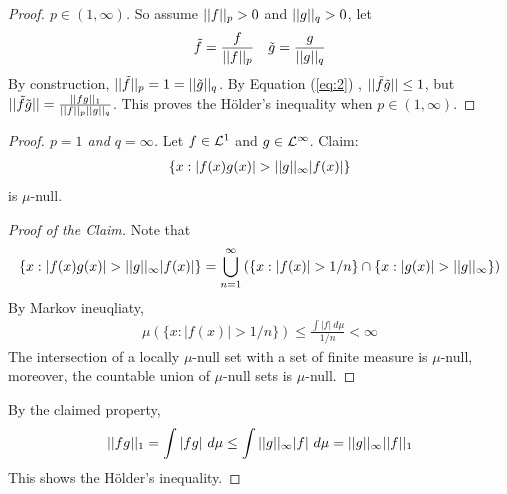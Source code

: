 \documentclass[11pt]{article}
\newcommand{\dmu}[0]{\ d\mu}
\begin{document}
\begin{theorem}
\begin{proof}[Proof. $p \in (1, \infty)$]
			So assume $\vert \vert {f} \vert \vert_p > 0$ and $\vert \vert {g} \vert \vert_q > 0$, let
			\begin{align}
				\tilde{f} = \frac{f}{\vert \vert {f} \vert \vert_p} \quad
				\tilde{g} = \frac{g}{\vert \vert {g} \vert \vert_q}
			\end{align}
			By construction, $\vert \vert {\tilde{f}} \vert \vert_p = 1 = \vert \vert {\tilde{g}} \vert \vert_q$.
			By Equation (\ref{eq:2}) , $\vert \vert {\tilde{f} \tilde{g}} \vert \vert \leq 1$, but $\vert \vert {\tilde{f} \tilde{g}} \vert \vert = \frac{\vert \vert {fg} \vert \vert_1}{\vert \vert {f} \vert \vert_p \vert \vert {g} \vert \vert_q}$. This proves the H\"older's inequality when $p \in (1, \infty)$.
		\end{proof}
		\begin{proof}[Proof. $p = 1$ and $q = \infty$]
			Let $f \in \mathcal{{L}}^1$ and $g \in \mathcal{{L}}^\infty$. Claim:
			\begin{align}
				\{x : \left \vert {f(x) g(x)} \right \vert > \vert \vert {g} \vert \vert_\infty |f(x)|\}
			\end{align}
			is $\mu$-null.
			\begin{tcolorbox}
				\begin{proof}[Proof of the Claim]
					Note that
					\begin{align}
						\{x : \left \vert {f(x) g(x)} \right \vert > \vert \vert {g} \vert \vert_\infty |f(x)|\} = \bigcup_{n=1}^\infty \left(\{x : |f(x)| > 1/n\} \cap \{x : |g(x)| > \vert \vert {g} \vert \vert_\infty\}\right)
					\end{align}
					By Markov ineuqliaty,
					\begin{align}
						\mu(\{x : |f(x)| > 1/n\}) \leq \frac{\int |f|\dmu}{1/n} < \infty
					\end{align}
					The intersection of a locally $\mu$-null set with a set of finite measure is $\mu$-null, moreover, the countable union of $\mu$-null sets is $\mu$-null.
				\end{proof}
			\end{tcolorbox}
			By the claimed property,
			\begin{align}
				\norm{fg}_1 = \int |fg|\dmu \leq \int \norm{g}_\infty |f|\dmu = \norm{g}_\infty \norm{f}_1
			\end{align}
			This shows the H\"older's inequality.
		\end{proof}
	\end{theorem}
	
\end{document}
